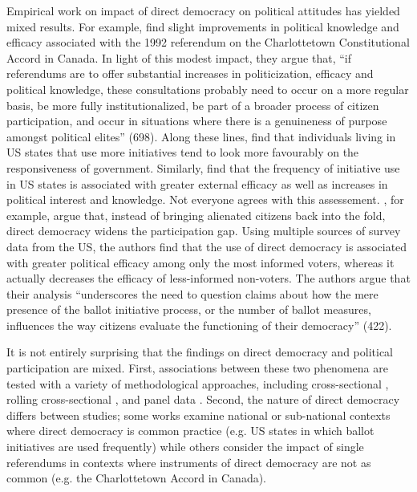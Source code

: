 \documentclass[12pt, letter]{article}
\begin{document}
Empirical work on impact of direct democracy on political attitudes has yielded mixed results. For example, \textcite{mendelsohn2000effect} find slight improvements in political knowledge and efficacy associated with the 1992 referendum on the Charlottetown Constitutional Accord in Canada. In light of this modest impact, they argue that,  ``if referendums are to offer substantial increases in politicization, efficacy and political knowledge, these consultations probably need to occur on a more regular basis, be more fully institutionalized, be part of a broader process of citizen participation, and occur in situations where there is a genuineness of purpose amongst political elites'' (698). Along these lines, \textcite{bowler2002democracy} find that individuals living in US states that use more initiatives tend to look more favourably on the responsiveness of government. Similarly, \textcite{smith2004educated} find that the frequency of initiative use in US states is associated with greater external efficacy as well as increases in political interest and knowledge. Not everyone agrees with this assessement. \textcite{dyck2009direct}, for example, argue that, instead of bringing alienated citizens back into the fold, direct democracy widens the participation gap. Using multiple sources of survey data from the US, the authors find that the use of direct democracy is associated with greater political efficacy among only the most informed voters, whereas it actually decreases the efficacy of less-informed non-voters. The authors argue that their analysis ``underscores the need to question claims about how the mere presence of the ballot initiative process, or the number of ballot measures, influences the way citizens evaluate the functioning of their democracy'' (422). 

It is not entirely surprising that the findings on direct democracy and political participation are mixed. First, associations between these two phenomena are tested with a variety of methodological approaches, including cross-sectional \parencite{bowler2002democracy}, rolling cross-sectional \parencite{mendelsohn2000effect}, and panel data \parencite{marien2017winner}. Second, the nature of direct democracy differs between studies; some works examine national or sub-national contexts where direct democracy is common practice (e.g. US states in which ballot initiatives are used frequently) while others consider the impact of single referendums in contexts where instruments of direct democracy are not as common (e.g. the Charlottetown Accord in Canada). 
\end{document}
